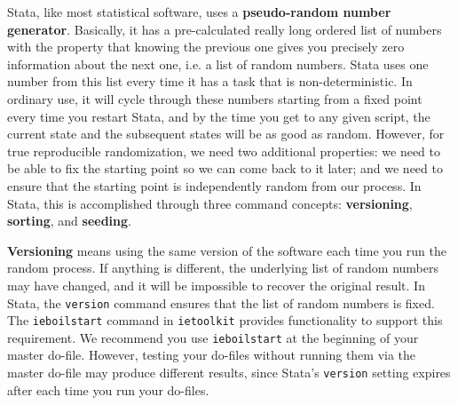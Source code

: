 Stata, like most statistical software, uses a \textbf{pseudo-random number generator}.
Basically, it has a pre-calculated really long ordered list of numbers with the property that
knowing the previous one gives you precisely zero information about the next one, i.e. a list of random numbers.
Stata uses one number from this list every time it has a task that is non-deterministic.
In ordinary use, it will cycle through these numbers starting from a fixed point
every time you restart Stata, and by the time you get to any given script,
the current state and the subsequent states will be as good as random.
However, for true reproducible randomization, we need two additional properties:
we need to be able to fix the starting point so we can come back to it later;
and we need to ensure that the starting point is independently random from our process.
In Stata, this is accomplished through three command concepts:
\textbf{versioning}, \textbf{sorting}, and \textbf{seeding}.

\textbf{Versioning} means using the same version of the software each time you run the random process.
If anything is different, the underlying list of random numbers may have changed,
and it will be impossible to recover the original result.
In Stata, the \texttt{version} command ensures that the list of random numbers is fixed.
The \texttt{ieboilstart} command in \texttt{ietoolkit} provides functionality to support this requirement.
We recommend you use \texttt{ieboilstart} at the beginning of your master do-file.
However, testing your do-files without running them
via the master do-file may produce different results,
since Stata's \texttt{version} setting expires after each time you run your do-files.

